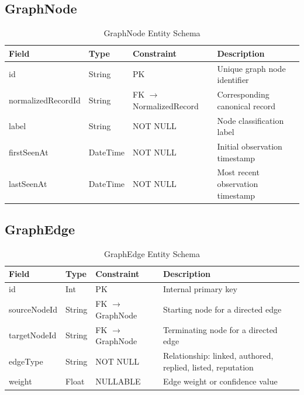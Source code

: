 \subsection{GraphNode}
\begin{table}[htpb]
\centering
\begin{tabular}{lllp{6cm}}
\toprule
\textbf{Field} & \textbf{Type} & \textbf{Constraint} & \textbf{Description} \\
\midrule
id & String & PK & Unique graph node identifier \\
normalizedRecordId & String & FK $\rightarrow$ NormalizedRecord & Corresponding canonical record \\
label & String & NOT NULL & Node classification label \\
firstSeenAt & DateTime & NOT NULL & Initial observation timestamp \\
lastSeenAt & DateTime & NOT NULL & Most recent observation timestamp \\
\bottomrule
\end{tabular}
\caption{GraphNode Entity Schema}
\end{table}

\subsection{GraphEdge}
\begin{table}[htpb]
\centering
\begin{tabular}{lllp{6cm}}
\toprule
\textbf{Field} & \textbf{Type} & \textbf{Constraint} & \textbf{Description} \\
\midrule
id & Int & PK & Internal primary key \\
sourceNodeId & String & FK $\rightarrow$ GraphNode & Starting node for a directed edge \\
targetNodeId & String & FK $\rightarrow$ GraphNode & Terminating node for a directed edge \\
edgeType & String & NOT NULL & Relationship: linked, authored, replied, listed, reputation \\
weight & Float & NULLABLE & Edge weight or confidence value \\
\bottomrule
\end{tabular}
\caption{GraphEdge Entity Schema}
\end{table}

